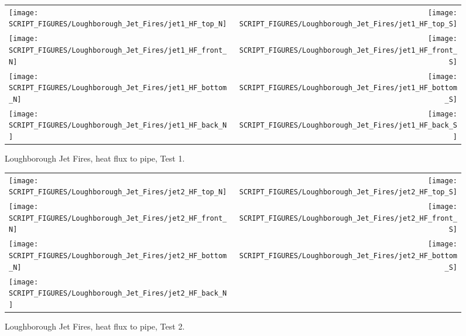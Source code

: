 \begin{figure}[p]
\begin{tabular*}{\textwidth}{l@{\extracolsep{\fill}}r}
\texttt{[image: SCRIPT\_FIGURES/Loughborough\_Jet\_Fires/jet1\_HF\_top\_N]} &
\texttt{[image: SCRIPT\_FIGURES/Loughborough\_Jet\_Fires/jet1\_HF\_top\_S]} \\
\texttt{[image: SCRIPT\_FIGURES/Loughborough\_Jet\_Fires/jet1\_HF\_front\_N]} &
\texttt{[image: SCRIPT\_FIGURES/Loughborough\_Jet\_Fires/jet1\_HF\_front\_S]} \\
\texttt{[image: SCRIPT\_FIGURES/Loughborough\_Jet\_Fires/jet1\_HF\_bottom\_N]} &
\texttt{[image: SCRIPT\_FIGURES/Loughborough\_Jet\_Fires/jet1\_HF\_bottom\_S]} \\
\texttt{[image: SCRIPT\_FIGURES/Loughborough\_Jet\_Fires/jet1\_HF\_back\_N]} &
\texttt{[image: SCRIPT\_FIGURES/Loughborough\_Jet\_Fires/jet1\_HF\_back\_S]} 
\end{tabular*}
\caption[Loughborough Jet Fires, heat flux to pipe, Test 1]{Loughborough Jet Fires, heat flux to pipe, Test 1.}
\label{Loughborough_1}
\end{figure}

\begin{figure}[p]
\begin{tabular*}{\textwidth}{l@{\extracolsep{\fill}}r}
\texttt{[image: SCRIPT\_FIGURES/Loughborough\_Jet\_Fires/jet2\_HF\_top\_N]} &
\texttt{[image: SCRIPT\_FIGURES/Loughborough\_Jet\_Fires/jet2\_HF\_top\_S]} \\
\texttt{[image: SCRIPT\_FIGURES/Loughborough\_Jet\_Fires/jet2\_HF\_front\_N]} &
\texttt{[image: SCRIPT\_FIGURES/Loughborough\_Jet\_Fires/jet2\_HF\_front\_S]} \\
\texttt{[image: SCRIPT\_FIGURES/Loughborough\_Jet\_Fires/jet2\_HF\_bottom\_N]} &
\texttt{[image: SCRIPT\_FIGURES/Loughborough\_Jet\_Fires/jet2\_HF\_bottom\_S]} \\
\texttt{[image: SCRIPT\_FIGURES/Loughborough\_Jet\_Fires/jet2\_HF\_back\_N]} &
\end{tabular*}
\caption[Loughborough Jet Fires, heat flux to pipe, Test 2]{Loughborough Jet Fires, heat flux to pipe, Test 2.}
\label{Loughborough_2}
\end{figure}

